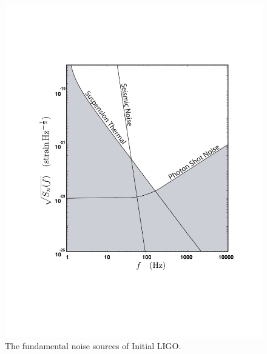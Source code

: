 \begin{figure}[p]
\begin{center}
\includegraphics[width=\linewidth]{figures/inspiral/ligonoise}
\end{center}
\caption[Fundamental Noise Sources of Initial LIGO]{%
\label{f:design_noisecurve}%
The fundamental noise sources of Initial LIGO.
}
\end{figure}

